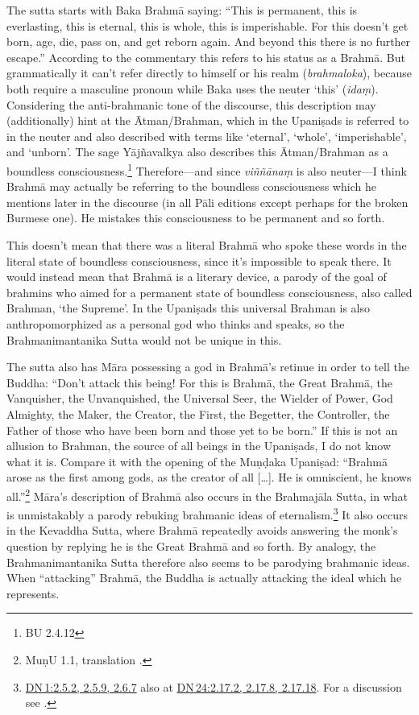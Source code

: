 \documentclass[10pt, openany]{book}
\begin{document}
The sutta starts with Baka Brahmā saying: “This is permanent, this is everlasting, this is eternal, this is whole, this is imperishable. For this doesn’t get born, age, die, pass on, and get reborn again. And beyond this there is no further escape.” According to the commentary this refers to his status as a Brahmā. But grammatically it can’t refer directly to himself or his realm (\textit{brahma­loka}), because both require a masculine pronoun while Baka uses the neuter ‘this’ (\textit{idaṃ}). Considering the anti-brahmanic tone of the discourse, this description may (additionally) hint at the Ātman/Brahman, which in the Upaniṣads is referred to in the neuter and also described with terms like ‘eternal’, ‘whole’, ‘imperishable’, and ‘unborn’. The sage Yājñavalkya also describes this Ātman/Brahman as a boundless consciousness.\footnote {BU 2.4.12} Therefore—and since \textit{viññānaṃ} is also neuter—I think Brahmā may actually be referring to the boundless consciousness which he mentions later in the discourse (in all Pāli editions except perhaps for the broken Burmese one). He mistakes this consciousness to be permanent and so forth.


This doesn’t mean that there was a literal Brahmā who spoke these words in the literal state of boundless consciousness, since it’s impossible to speak there. It would instead mean that Brahmā is a literary device, a parody of the goal of brahmins who aimed for a permanent state of boundless consciousness, also called Brahman, ‘the Supreme’. In the Upaniṣads this universal Brahman is also anthropomorphized as a personal god who thinks and speaks, so the Brahmanimantanika Sutta would not be unique in this.


The sutta also has Māra possessing a god in Brahmā’s retinue in order to tell the Buddha: “Don’t attack this being! For this is Brahmā, the Great Brahmā, the Vanquisher, the Unvanquished, the Universal Seer, the Wielder of Power, God Almighty, the Maker, the Creator, the First, the Begetter, the Controller, the Father of those who have been born and those yet to be born.” If this is not an allusion to Brahman, the source of all beings in the Upaniṣads, I do not know what it is. Compare it with the opening of the Muṇḍaka Upaniṣad: “Brahmā arose as the first among gods, as the creator of all […]. He is omniscient, he knows all.”\footnote {MuṇU 1.1, translation \cite{Olivelle}.} Māra’s description of Brahmā also occurs in the Brahmajāla Sutta, in what is unmistakably a parody rebuking brahmanic ideas of eternalism.\footnote {\href{https://suttacentral.net/dn1/en/sujato\#2.5.2}{DN 1:2.5.2, 2.5.9, 2.6.7} also at \href{https://suttacentral.net/dn24/en/sujato\#2.17.2}{DN 24:2.17.2, 2.17.8, 2.17.18}. For a discussion see \cite{Sunyo 2023}.} It also occurs in the Kevaddha Sutta, where Brahmā repeatedly avoids answering the monk’s question by replying he is the Great Brahmā and so forth. By analogy, the Brahmanimantanika Sutta therefore also seems to be parodying brahmanic ideas. When “attacking” Brahmā, the Buddha is actually attacking the ideal which he represents.
\end{document}
